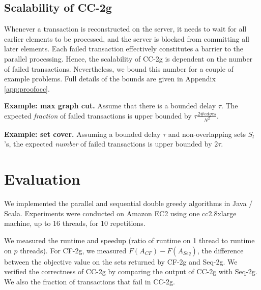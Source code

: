 \documentclass{article} %
\newcommand{\hogwild}{CF-2g}
\newcommand{\occ}{CC-2g}
\newcommand{\seqalg}{Seq-2g}
\newcommand{\hogwildshort}{CF}
\newcommand{\seqalgshort}{Seq}
\begin{document}
\subsection{Scalability of \occ{}}
Whenever a transaction is reconstructed on the server, it needs to wait for all earlier elements to be processed, and the server is blocked from committing all later elements.
Each failed transaction effectively constitutes a barrier to the parallel processing.
Hence, the scalability of \occ{} is dependent on the number of failed transactions.
Nevertheless, we bound this number for a couple of example problems.
Full details of the bounds are given in Appendix \ref{app:proofocc}.

\textbf{Example: max graph cut.}
Assume that there is a bounded delay $\tau$.
The expected \emph{fraction} of failed transactions is upper bounded by $\tau \frac{2\#edges}{N^2}$.

\textbf{Example: set cover.}
Assuming a bounded delay $\tau$ and non-overlapping sets $S_l$'s, the expected \emph{number} of failed transactions is upper bounded by $2\tau$.

















\section{Evaluation \label{sec:evaluation}}

We implemented the parallel and sequential double greedy algorithms in Java / Scala.
Experiments were conducted on Amazon EC2 using one cc2.8xlarge machine, up to 16 threads, for 10 repetitions.

We measured the runtime and speedup (ratio of runtime on 1 thread to runtime on $p$ threads).
For \hogwild{}, we measured $F(A_{\hogwildshort})-F(A_{\seqalgshort})$, the difference between the objective value on the sets returned by \hogwild{} and \seqalg{}.
We verified the correctness of \occ{} by comparing the output of \occ{} with \seqalg{}.
We also the fraction of transactions that fail in \occ{}.
\end{document}
